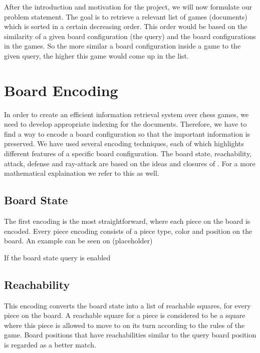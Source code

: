 \documentclass[11pt]{article}
\begin{document}
    After the introduction and motivation for the project, we will now formulate our problem statement. The goal is to retrieve a relevant list of games (documents) which is sorted in a certain decreasing order. This order would be based on the similarity of a given board configuration (the query) and the board configurations in the games. So the more similar a board configuration inside a game to the given query, the higher this game would come up in the list.



    \section{Board Encoding}

    In order to create an efficient information retrieval system over chess games, we need to develop appropriate indexing for the documents. Therefore, we have to find a way to encode a board configuration so that the important information is preserved. We have used several encoding techniques, each of which highlights different features of a specific board configuration. The board state, reachability, attack, defense and ray-attack are based on the ideas and closures of \cite{SimilarChessPositions}. For a more mathematical explaination we refer to this as well.

    \subsection{Board State}

    The first encoding is the most straightforward, where each piece on the board is encoded. Every piece encoding consists of a piece type, color and position on the board. An example can be seen on (placeholder)

    If the board state query is enabled

    \subsection{Reachability}

    This encoding converts the board state into a list of reachable squares, for every piece on the board. A reachable square for a piece is considered to be a square where this piece is allowed to move to on its turn according to the rules of the game. Board positions that have reachabilities similar to the query board position is regarded as a better match.
\end{document}
